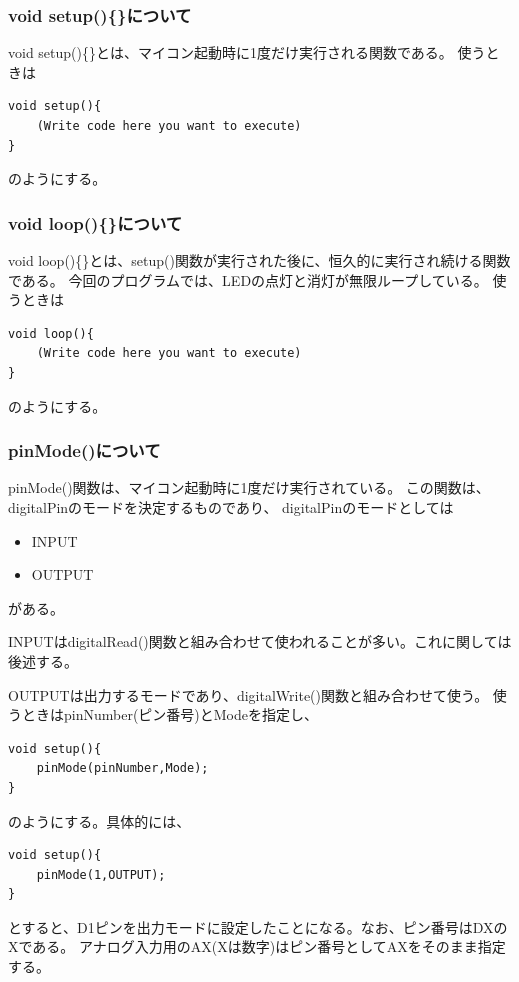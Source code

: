 \documentclass[uplatex]{jsarticle}
\begin{document}
\subsubsection{void setup()\{\}について}
void setup()\{\}とは、マイコン起動時に1度だけ実行される関数である。
使うときは
\begin{lstlisting}[basicstyle=\ttfamily\footnotesize, frame=single]
void setup(){
    (Write code here you want to execute)
}
\end{lstlisting}
のようにする。
\subsubsection{void loop()\{\}について}
void loop()\{\}とは、setup()関数が実行された後に、恒久的に実行され続ける関数である。
今回のプログラムでは、LEDの点灯と消灯が無限ループしている。
使うときは
\begin{lstlisting}[basicstyle=\ttfamily\footnotesize, frame=single]
void loop(){
    (Write code here you want to execute)
}
\end{lstlisting}
のようにする。
\subsubsection{pinMode()について}
pinMode()関数は、マイコン起動時に1度だけ実行されている。
この関数は、digitalPinのモードを決定するものであり、
digitalPinのモードとしては
\begin{itemize}
    \item INPUT
    \item OUTPUT
\end{itemize}
がある。

INPUTはdigitalRead()関数と組み合わせて使われることが多い。これに関しては後述する。

OUTPUTは出力するモードであり、digitalWrite()関数と組み合わせて使う。
使うときはpinNumber(ピン番号)とModeを指定し、
\begin{lstlisting}[basicstyle=\ttfamily\footnotesize, frame=single]
void setup(){
    pinMode(pinNumber,Mode);
}
\end{lstlisting}
のようにする。具体的には、
\begin{lstlisting}[basicstyle=\ttfamily\footnotesize, frame=single]
void setup(){
    pinMode(1,OUTPUT);
}
\end{lstlisting}
とすると、D1ピンを出力モードに設定したことになる。なお、ピン番号はDXのXである。
アナログ入力用のAX(Xは数字)はピン番号としてAXをそのまま指定する。
\end{document}
